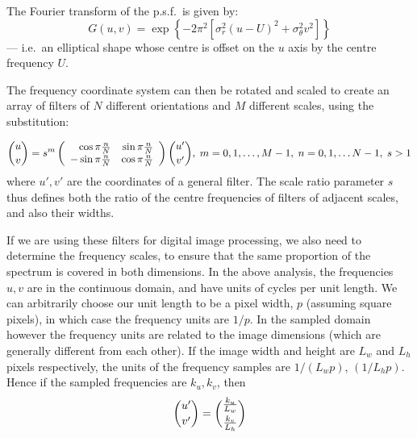 \documentclass[12pt,a4]{article}
\begin{document}
The Fourier transform of the p.s.f.\ is given by:
\begin{equation}
  G(u,v) = \exp \left\{ -2\pi^2\left[ \sigma_r^2 (u-U)^2 +\sigma_\theta^2 v^2 \right] \right\}\label{eq:G}
\end{equation}
--- i.e.\ an elliptical shape whose centre is offset on the $u$ axis by the centre frequency $U$.

The frequency coordinate system can then be rotated and scaled to create an array of filters of $N$ different orientations and $M$ different scales, using the substitution:

\[ {u \choose v} = s^m \left( \begin{array}{rr}\cos \pi{n\over N} & \sin
    \pi{n\over N} \\ -\sin \pi{n\over N} & \cos \pi{n\over N}
  \end{array}\right) {u' \choose v'} ,\; m = 0, 1, \ldots, M-1,\; n = 0, 1,
\ldots N-1,\; s > 1 \] where $u', v'$ are the coordinates of a general filter.
The scale ratio parameter $s$ thus defines both the ratio of the centre
frequencies of filters of adjacent scales, and also their widths.

If we are using these filters for digital image processing, we also need to determine the frequency scales, to ensure that the same proportion of the spectrum is covered in both dimensions.  In the above analysis, the frequencies $u, v$ are in the continuous domain, and have units of cycles per unit length.  We can arbitrarily choose our unit length to be a pixel width, $p$ (assuming square pixels), in which case the frequency units are $1/p$.  In the sampled domain however the frequency units are related to the image dimensions (which are generally different from each other).  If the image width and height are $L_w$ and $L_h$ pixels respectively, the units of the frequency samples are $1/(L_w p)$, $(1/L_h p)$.  Hence if the sampled frequencies are $k_u, k_v$, then
\[ {u' \choose v'} = {{k_u \over L_w} \choose {k_v \over L_h}} \]
\end{document}
